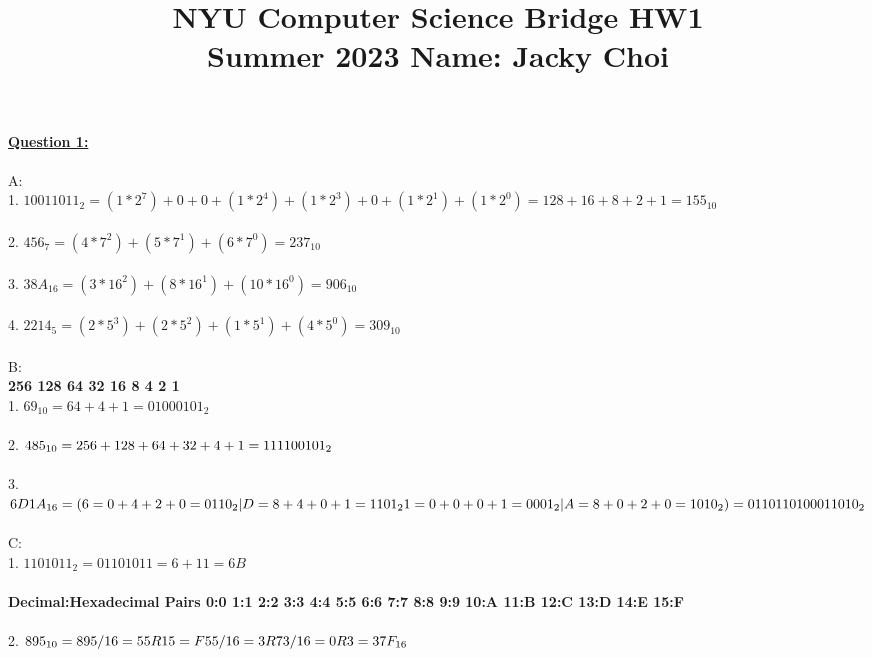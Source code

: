 \documentclass[11pt]{article}
\title{\textbf{NYU Computer Science Bridge HW1}\\
Summer 2023 Name: Jacky Choi}
\date{}
\begin{document}
\setul{}{2pt}

\maketitle


\noindent \textbf{\ul{Question 1:}} \\
\\


\noindent 
A: \\
1. $ 10011011_{2} = (1*2^7) + 0 + 0 + (1*2^4) + (1*2^3) + 0 +(1*2^1) + (1*2^0)  = 128 + 16 + 8 + 2 + 1 = 155_{10} $\\
\\
2. $ 456_{7} = (4*7^2) + (5*7^1) + (6*7^0) = 237_{10} $\\
\\
3. $ 38A_{16} = (3*16^2) + (8*16^1) + (10*16^0) = 906_{10} $ \\
\\
4. $ 2214_{5} = (2*5^3) + (2*5^2) + (1*5^1) + (4*5^0) = 309_{10}$ \\
\\
B: \\
\textbf{256 128 64 32 16 8 4 2 1} 
\\
1. $ 69_{10} =  64 + 4 + 1 = 0100 0101_{2} $\\
\\
2. $ 485_{10} = 256 + 128 + 64 + 32 + 4 + 1 \\= 111100101_{2} $\\
\\
3. $ 6D1A_{16} = (
6 = 0+ 4 + 2 + 0 = 0110_{2} | D =  8 + 4 + 0 + 1 = 1101_{2}\\ 1 = 0 + 0 + 0 +1 = 0001_{2} | A = 8 + 0 + 2 + 0 = 1010_{2})
= 0110 1101 0001 1010_{2} $\\
\\
C:\\
1. $ 1101011_{2} = 0110 1011 = 6 + 11 = 6B $ \\
\\
\textbf{Decimal:Hexadecimal Pairs 0:0 1:1 2:2 3:3 4:4 5:5 6:6 7:7 8:8 9:9 10:A 11:B 12:C 13:D 14:E 15:F}
\\
\\
2. $ 895_{10} =  895 / 16 = 55 R 15 = F \\55 / 16 = 3 R 7 \\3 / 16 = 0 R 3 
 = 37F_{16} $ 

\pagebreak
\end{document}
